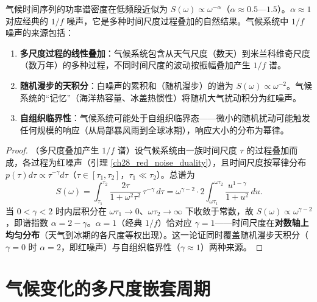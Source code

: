 \begin{proposition}\label{prop:one_over_f_noise}
气候时间序列的功率谱密度在低频段近似为 $S(\omega) \propto \omega^{-\alpha}$（$\alpha \approx 0.5$—$1.5$）。$\alpha \approx 1$ 对应经典的 $1/f$ 噪声，它是多种时间尺度过程叠加的自然结果。气候系统中 $1/f$ 噪声的来源包括：
\begin{enumerate}[label=(\roman*)]
    \item \textbf{多尺度过程的线性叠加}：气候系统包含从天气尺度（数天）到米兰科维奇尺度（数万年）的多种过程，不同时间尺度的波动按振幅叠加产生 $1/f$ 谱。
    \item \textbf{随机漫步的天积分}：白噪声的累积和（随机漫步）的谱为 $S(\omega) \propto \omega^{-2}$。气候系统的“记忆”（海洋热容量、冰盖热惯性）将随机大气扰动积分为红噪声。
    \item \textbf{自组织临界性}：气候系统可能处于自组织临界态——微小的随机扰动可能触发任何规模的响应（从局部暴风雨到全球冰期），响应大小的分布为幂律。
\end{enumerate}
\end{proposition}

\begin{proof}
（多尺度叠加产生 $1/f$ 谱）设气候系统由一族时间尺度 $\tau$ 的过程叠加而成，各过程为红噪声（引理 \ref{ch28_red_noise_duality}），且时间尺度按幂律分布 $p(\tau)d\tau \propto \tau^{-\gamma}d\tau$（$\tau \in [\tau_1, \tau_2]$，$\tau_1 \ll \tau_2$）。总谱为
\[
S(\omega) = \int_{\tau_1}^{\tau_2} \frac{2\tau}{1+\omega^2\tau^2}\,\tau^{-\gamma}\,d\tau
= \omega^{\gamma-2} \cdot 2\int_{\omega\tau_1}^{\omega\tau_2} \frac{u^{1-\gamma}}{1+u^2}\,du.
\]
当 $0 < \gamma < 2$ 时内层积分在 $\omega\tau_1 \to 0$、$\omega\tau_2 \to \infty$ 下收敛于常数，故 $S(\omega) \propto \omega^{\gamma-2}$，即谱指数 $\alpha = 2-\gamma$。$\alpha = 1$（经典 $1/f$）恰对应 $\gamma = 1$——时间尺度在\textbf{对数轴上均匀分布}（天气到冰期的各尺度等权出现）。这一论证同时覆盖随机漫步天积分（$\gamma = 0$ 时 $\alpha = 2$，即红噪声）与自组织临界性（$\gamma \approx 1$）两种来源。
\end{proof}

\section{气候变化的多尺度嵌套周期}

